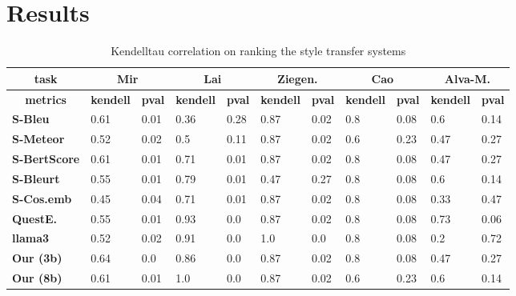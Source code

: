 \section{Results}
\label{app:results}
\begin{table*}%
\centering 
\begin{tabular}{@{}lllllllllll@{}}
\toprule
\multicolumn{1}{c}{\textbf{task}} & \multicolumn{2}{c}{\textbf{Mir}} & \multicolumn{2}{c}{\textbf{Lai}} & \multicolumn{2}{c}{\textbf{Ziegen.}} & \multicolumn{2}{c}{\textbf{Cao}} & \multicolumn{2}{c}{\textbf{Alva-M.}} \\ \midrule
\multicolumn{1}{c}{\textbf{metrics}} & \multicolumn{1}{c}{\textbf{kendell}} & \multicolumn{1}{c}{\textbf{pval}} & \multicolumn{1}{c}{\textbf{kendell}} & \multicolumn{1}{c}{\textbf{pval}} & \multicolumn{1}{c}{\textbf{kendell}} & \multicolumn{1}{c}{\textbf{pval}} & \multicolumn{1}{c}{\textbf{kendell}} & \multicolumn{1}{c}{\textbf{pval}} & \multicolumn{1}{c}{\textbf{kendell}} & \multicolumn{1}{c}{\textbf{pval}} \\
\textbf{S-Bleu} & 0.61 & 0.01 & 0.36 & 0.28 & 0.87 & 0.02 & 0.8 & 0.08 & 0.6 & 0.14 \\
\textbf{S-Meteor} & 0.52 & 0.02 & 0.5 & 0.11 & 0.87 & 0.02 & 0.6 & 0.23 & 0.47 & 0.27 \\
\textbf{S-BertScore} & 0.61 & 0.01 & 0.71 & 0.01 & 0.87 & 0.02 & 0.8 & 0.08 & 0.47 & 0.27 \\
\textbf{S-Bleurt} & 0.55 & 0.01 & 0.79 & 0.01 & 0.47 & 0.27 & 0.8 & 0.08 & 0.6 & 0.14 \\
\textbf{S-Cos.emb} & 0.45 & 0.04 & 0.71 & 0.01 & 0.87 & 0.02 & 0.8 & 0.08 & 0.33 & 0.47 \\
\textbf{QuestE.} & 0.55 & 0.01 & 0.93 & 0.0 & 0.87 & 0.02 & 0.8 & 0.08 & 0.73 & 0.06 \\
\textbf{llama3} & 0.52 & 0.02 & 0.91 & 0.0 & 1.0 & 0.0 & 0.8 & 0.08 & 0.2 & 0.72 \\
\textbf{Our (3b)} & 0.64 & 0.0 & 0.86 & 0.0 & 0.87 & 0.02 & 0.8 & 0.08 & 0.47 & 0.27 \\
\textbf{Our (8b)} & 0.61 & 0.01 & 1.0 & 0.0 & 0.87 & 0.02 & 0.6 & 0.23 & 0.6 & 0.14 \\ \bottomrule
\end{tabular}
\caption{Kendelltau correlation on ranking the style transfer systems}
\label{tab:ranking}
\end{table*}


